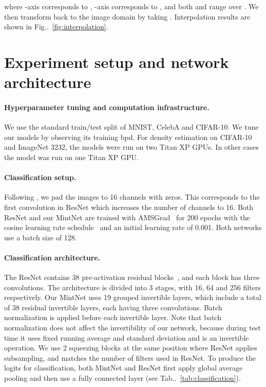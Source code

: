 \documentclass{article}
\makeatletter
\def\@onedot{\ifx\@let@token.\else.\null\fi\xspace}
\DeclareRobustCommand\onedot{\futurelet\@let@token\@onedot}
\newcommand{\figref}[1]{Fig\onedot~\ref{#1}}
\newcommand{\tabref}[1]{Tab\onedot~\ref{#1}}
\makeatother
\begin{document}
where -axis corresponds to , -axis corresponds to , and both  and  range over . We then transform  back to the image domain by taking . Interpolation results are shown in \figref{fig:interpolation}.

\section{Experiment setup and network architecture}
\label{app:network}
\paragraph{Hyperparameter tuning and computation infrastructure.} We use the standard train/test split of MNIST, CelebA and CIFAR-10. We tune our models by observing its training bpd. For density estimation on CIFAR-10 and ImageNet 3232, the models were run on two Titan XP GPUs. In other cases the model was run on one Titan XP GPU.

\paragraph{Classification setup.} Following \cite{i-resnet}, we pad the images to 16 channels with zeros. This corresponds to the first convolution in ResNet which increases the number of channels to 16. Both ResNet and our MintNet are trained with AMSGrad~\cite{reddi2018on} for 200 epochs with the cosine learning rate schedule~\cite{loshchilov2016sgdr} and an initial learning rate of 0.001. Both networks use a batch size of 128.

\paragraph{Classification architecture.} The ResNet contains 38 pre-activation residual blocks~\cite{he2016identity}, and each block has three  convolutions. The architecture is divided into 3 stages, with 16, 64 and 256 filters respectively. Our MintNet uses 19 grouped invertible layers, which include a total of 38 residual invertible layers, each having three  convolutions. Batch normalization is applied before each invertible layer. Note that batch normalization does not affect the invertibility of our network, because during test time it uses fixed running average and standard deviation and is an invertible operation. We use 2 squeezing blocks at the same position where ResNet applies subsampling, and matches the number of filters used in ResNet. To produce the logits for classification, both MintNet and ResNet first apply global average pooling and then use a fully connected layer (see \tabref{tab:classification}).
\end{document}
